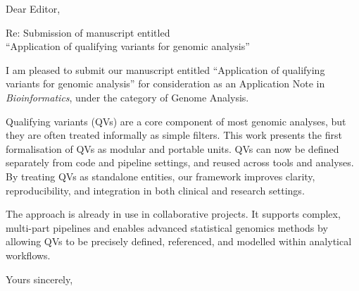 \documentclass[12pt,a4paper]{letter}
\begin{document}
 
\begin{letter}{Dear Editor,}

Re: Submission of manuscript entitled\\ ``Application of qualifying variants for genomic analysis''

\opening{}

I am pleased to submit our manuscript entitled ``Application of qualifying variants for genomic analysis'' for consideration as an Application Note in \textit{Bioinformatics}, under the category of Genome Analysis.

Qualifying variants (QVs) are a core component of most genomic analyses, but they are often treated informally as simple filters. This work presents the first formalisation of QVs as modular and portable units. QVs can now be defined separately from code and pipeline settings, and reused across tools and analyses. By treating QVs as standalone entities, our framework improves clarity, reproducibility, and integration in both clinical and research settings.

The approach is already in use in collaborative projects. It supports complex, multi-part pipelines and enables advanced statistical genomics methods by allowing QVs to be precisely defined, referenced, and modelled within analytical workflows.


\closing{Yours sincerely,}

\end{letter}
\end{document}

